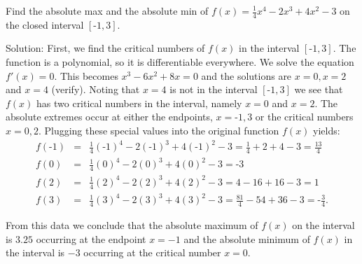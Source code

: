 \documentclass[handout]{ximera}
\begin{document}
\begin{example}[example 3] Find the absolute max and the absolute min of $f(x) = \frac14 x^4 - 2x^3 + 4x^2 - 3$ on the 
closed interval $[\text{-}1, 3]$.


Solution:  First, we find the critical numbers of $f(x)$ in the interval $[\text{-}1, 3]$. 
The function is a polynomial, so it is differentiable everywhere.  
We solve the equation $f'(x) =0$.  This becomes $x^3 -6x^2 + 8x = 0$ and the solutions are $x=0, x=2$ and $x=4$ (verify). 
Noting that $x = 4$ is not in the interval $[\text{-}1,3]$ we see that 
$f(x)$ has two critical numbers in the interval, namely $x = 0$ and $x = 2$.
The absolute extremes occur at either the endpoints, $x=\text{-}1, 3$ or the critical numbers $x = 0,2$.  
Plugging these special values into the original function $f(x)$ yields:
\begin{eqnarray*}
f(\text{-}1) &=& \frac14(\text{-}1)^4 -2(\text{-}1)^3 + 4(\text{-}1)^2 - 3 = \frac14 + 2 + 4 - 3 = \frac{13}{4}\\
f(0) &=& \frac14 (0)^4 -2(0)^3 + 4(0)^2 - 3 = \text{-}3\\
f(2) &=& \frac14(2)^4 -2(2)^3 + 4(2)^2 - 3 = 4 -16 + 16 -3 = 1\\
f(3) &=& \frac14(3)^4 -2(3)^3 + 4(3)^2 - 3 = \frac{81}{4} - 54 + 36 - 3 = \text{-}\frac34.
\end{eqnarray*}


From this data we conclude that the absolute maximum of $f(x)$ on the interval is $3.25$ occurring 
at the endpoint $x = -1$ and the absolute minimum of $f(x)$ in the interval is $-3$
occurring at the critical number $x = 0$.
\begin{image}
\end{image}
\end{example}
\end{document}
